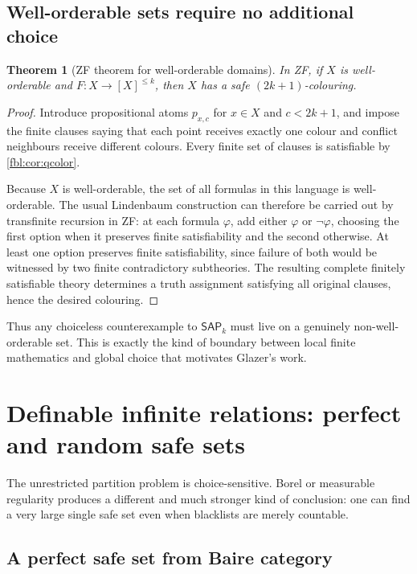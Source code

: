 \documentclass[11pt]{article}
\newtheorem{theorem}{Theorem}[section]
\theoremstyle{definition}
\theoremstyle{remark}
\newcommand{\SAP}{\mathsf{SAP}}
\begin{document}
\subsection{Well-orderable sets require no additional choice}

\begin{theorem}[ZF theorem for well-orderable domains]\label{fbl:thm:wellorderable}
In ZF, if $X$ is well-orderable and $F:X\to[X]^{\le k}$, then $X$ has a
safe $(2k+1)$-colouring.
\end{theorem}

\begin{proof}
Introduce propositional atoms $p_{x,c}$ for $x\in X$ and
$c<2k+1$, and impose the finite clauses saying that each point receives
exactly one colour and conflict neighbours receive different colours.
Every finite set of clauses is satisfiable by \cref{fbl:cor:qcolor}.

Because $X$ is well-orderable, the set of all formulas in this language is
well-orderable.  The usual Lindenbaum construction can therefore be carried
out by transfinite recursion in ZF: at each formula $\varphi$, add either
$\varphi$ or $\neg\varphi$, choosing the first option when it preserves
finite satisfiability and the second otherwise.  At least one option
preserves finite satisfiability, since failure of both would be witnessed by
two finite contradictory subtheories.  The resulting complete finitely
satisfiable theory determines a truth assignment satisfying all original
clauses, hence the desired colouring.
\end{proof}

Thus any choiceless counterexample to $\SAP_k$ must live on a genuinely
non-well-orderable set.  This is exactly the kind of boundary between local
finite mathematics and global choice that motivates Glazer's work.

\section{Definable infinite relations: perfect and random safe sets}\label{fbl:sec:definable}

The unrestricted partition problem is choice-sensitive.  Borel or measurable
regularity produces a different and much stronger kind of conclusion: one
can find a very large single safe set even when blacklists are merely
countable.

\subsection{A perfect safe set from Baire category}
\end{document}
